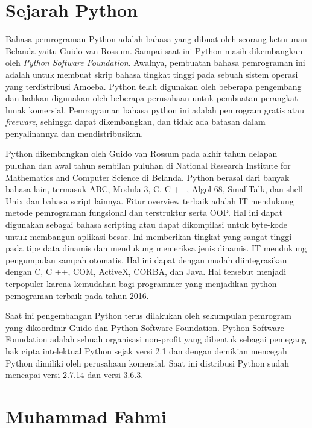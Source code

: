 \section{Sejarah Python}
Bahasa pemrograman Python adalah bahasa yang dibuat oleh seorang keturunan Belanda yaitu Guido van Rossum. Sampai saat ini Python masih dikembangkan oleh \textit{Python Software Foundation}. Awalnya, pembuatan bahasa pemrograman ini adalah untuk membuat skrip bahasa tingkat tinggi pada sebuah sistem operasi yang terdistribusi Amoeba. Python telah digunakan oleh beberapa pengembang dan bahkan digunakan oleh beberapa perusahaan untuk pembuatan perangkat lunak komersial. Pemrograman bahasa python ini adalah pemrogram gratis atau \textit{freeware}, sehingga dapat dikembangkan, dan tidak ada batasan dalam penyalinannya dan mendistribusikan. 

Python dikembangkan oleh Guido van Rossum pada akhir tahun delapan puluhan dan awal tahun sembilan puluhan di National Research Institute for Mathematics and Computer Science di Belanda. Python berasal dari banyak bahasa lain, termasuk ABC, Modula-3, C, C ++, Algol-68, SmallTalk, dan shell Unix dan bahasa script lainnya.
Fitur overview terbaik adalah IT mendukung metode pemrograman fungsional dan terstruktur serta OOP. Hal ini dapat digunakan sebagai bahasa scripting atau dapat dikompilasi untuk byte-kode untuk membangun aplikasi besar. Ini memberikan tingkat yang sangat tinggi pada tipe data dinamis dan mendukung memeriksa jenis dinamis. IT mendukung pengumpulan sampah otomatis. Hal ini dapat dengan mudah diintegrasikan dengan C, C ++, COM, ActiveX, CORBA, dan Java. Hal tersebut menjadi terpopuler karena kemudahan bagi programmer yang menjadikan python pemograman terbaik pada tahun 2016.

Saat ini pengembangan Python terus dilakukan oleh sekumpulan pemrogram yang dikoordinir Guido dan Python Software Foundation. Python Software Foundation adalah sebuah organisasi non-profit yang dibentuk sebagai pemegang hak cipta intelektual Python sejak versi 2.1 dan dengan demikian mencegah Python dimiliki oleh perusahaan komersial. Saat ini distribusi Python sudah mencapai versi 2.7.14 dan versi 3.6.3. 

\section{Muhammad Fahmi}

